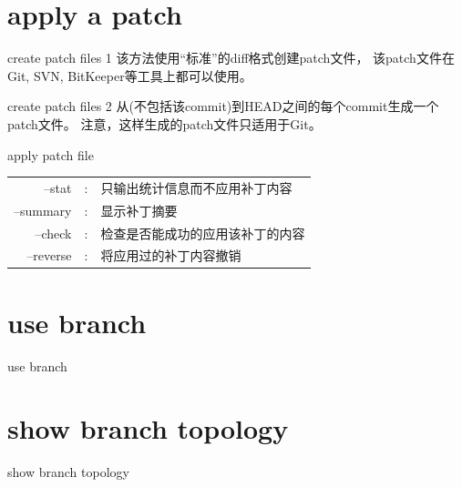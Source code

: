 ﻿\documentclass{beamer}
\begin{document}
\section[apply a patch]{apply a patch}
\begin{frame}{create patch files 1}
{\ttfamily
  该方法使用“标准”的diff格式创建patch文件，
  该patch文件在Git, SVN, BitKeeper等工具上都可以使用。
}
\end{frame}
\begin{frame}{create patch files 2}
{\ttfamily
  从(不包括该commit)到HEAD之间的每个commit生成一个patch文件。
  注意，这样生成的patch文件只适用于Git。
}
\end{frame}
\begin{frame}{apply patch file}
{\ttfamily
  \begin{tabular}{rcl}
    --stat&:&只输出统计信息而不应用补丁内容\\
    --summary&:&显示补丁摘要\\
    --check&:&检查是否能成功的应用该补丁的内容\\
    --reverse&:&将应用过的补丁内容撤销\\
  \end{tabular}
}
\end{frame}

\section[use branch]{use branch}
\begin{frame}{use branch}
\end{frame}

\section[show branch topology]{show branch topology}
\begin{frame}{show branch topology}
\end{frame}
\end{document}
